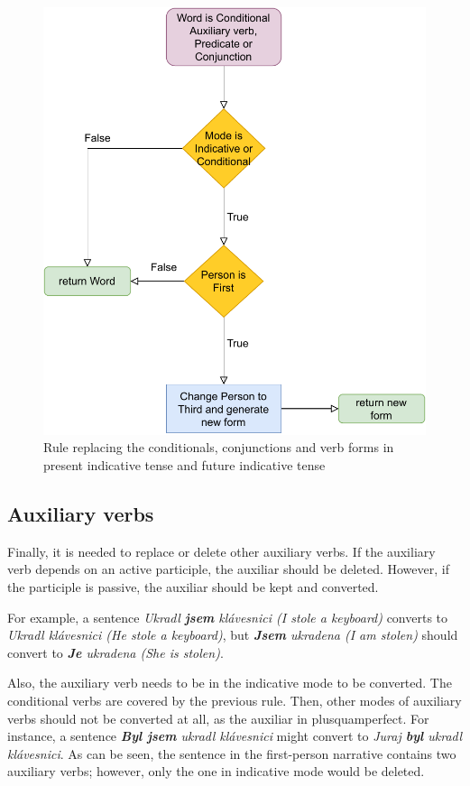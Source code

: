 \begin{figure}[!htbp]
\includegraphics[width=\textwidth]{data/Icher-Predicate-Rule.pdf}
\caption{Rule replacing the conditionals, conjunctions and verb forms in present indicative tense and future indicative tense}
\label{fig:icher-predicate-rule}
\end{figure}

\subsection{Auxiliary verbs} \label{sec:aux-del}

Finally, it is needed to replace or delete other auxiliary verbs. If the auxiliary verb depends on an active participle, the auxiliar should be deleted. However, if the participle is passive, the auxiliar should be kept and converted.

For example, a sentence \emph{Ukradl \textbf{jsem} klávesnici (I stole a keyboard)} converts to \emph{Ukradl klávesnici (He stole a keyboard)}, but \emph{\textbf{Jsem} ukradena (I am stolen)} should convert to \emph{\textbf{Je} ukradena (She is stolen)}.

Also, the auxiliary verb needs to be in the indicative mode to be converted. The conditional verbs are covered by the previous rule. Then, other modes of auxiliary verbs should not be converted at all, as the auxiliar in plusquamperfect. For instance, a sentence \emph{\textbf{Byl jsem} ukradl klávesnici} might convert to \emph{Juraj \textbf{byl} ukradl klávesnici}. As can be seen, the sentence in the first-person narrative contains two auxiliary verbs; however, only the one in indicative mode would be deleted.

